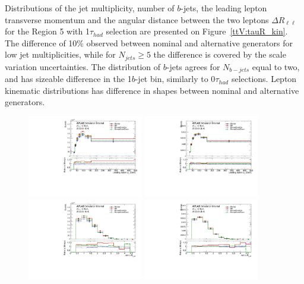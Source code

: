 Distributions of the jet multiplicity, number of $b$-jets, the leading lepton transverse momentum and the angular distance between the two leptons  $\Delta R _{\ell \ell }$ for the Region 5 with 1$\tau_{had}$ selection are presented on Figure~\ref{ttV:tauR_kin}.
The difference of 10\% observed between nominal and alternative generators for low jet multiplicities, while for $N_{jets}\geq5$ the difference is covered by the scale variation uncertainties. 
The distribution of $b$-jets agrees for $N_{b-jets}$ equal to two, and has sizeable difference in the 1$b$-jet bin, similarly to 0$\tau_{had}$ selections.
Lepton kinematic distributions has difference in shapes between nominal and alternative generators.

\begin{figure}[!htb]
\centering
\includegraphics[width=0.45\textwidth]{Plots/ttV/c_Region_0_lep_Pt_0}
\includegraphics[width=0.45\textwidth]{Plots/ttV/c_Region_1_lep_Pt_0}\\
\includegraphics[width=0.45\textwidth]{Plots/ttV/c_Region_0_min_DRl0j}
\includegraphics[width=0.45\textwidth]{Plots/ttV/c_Region_1_min_DRl0j}\\

\end{figure}
